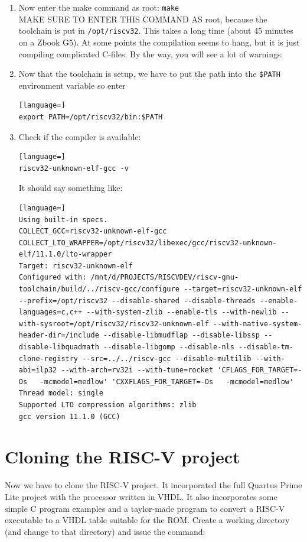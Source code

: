 \documentclass[12pt]{article}
\begin{document}
\begin{enumerate}
\item Now enter the make command as root: \lstinline|make|\\
MAKE SURE TO ENTER THIS COMMAND AS root, because the toolchain is put in \lstinline|/opt/riscv32|. This takes a long time (about 45 minutes on a Zbook G5). At some points the compilation seems to hang, but it is just compiling complicated C-files. By the way, you will see a lot of warnings.
\item Now that the toolchain is setup, we have to put the path into the \lstinline|$PATH| environment variable so enter
\begin{lstlisting}[language=]
export PATH=/opt/riscv32/bin:$PATH
\end{lstlisting}
\item Check if the compiler is available:
\begin{lstlisting}[language=]
riscv32-unknown-elf-gcc -v
\end{lstlisting}
It should say something like:
\begin{lstlisting}[language=]
Using built-in specs.
COLLECT_GCC=riscv32-unknown-elf-gcc
COLLECT_LTO_WRAPPER=/opt/riscv32/libexec/gcc/riscv32-unknown-elf/11.1.0/lto-wrapper
Target: riscv32-unknown-elf
Configured with: /mnt/d/PROJECTS/RISCVDEV/riscv-gnu-toolchain/build/../riscv-gcc/configure --target=riscv32-unknown-elf --prefix=/opt/riscv32 --disable-shared --disable-threads --enable-languages=c,c++ --with-system-zlib --enable-tls --with-newlib --with-sysroot=/opt/riscv32/riscv32-unknown-elf --with-native-system-header-dir=/include --disable-libmudflap --disable-libssp --disable-libquadmath --disable-libgomp --disable-nls --disable-tm-clone-registry --src=../../riscv-gcc --disable-multilib --with-abi=ilp32 --with-arch=rv32i --with-tune=rocket 'CFLAGS_FOR_TARGET=-Os   -mcmodel=medlow' 'CXXFLAGS_FOR_TARGET=-Os   -mcmodel=medlow'
Thread model: single
Supported LTO compression algorithms: zlib
gcc version 11.1.0 (GCC) 
\end{lstlisting}
\end{enumerate}

\section{Cloning the RISC-V project}
\label{sec:cloning}
Now we have to clone the RISC-V project. It incorporated the full Quartus Prime Lite project with the processor written in VHDL. It also incorporates some simple C program examples and a taylor-made program to convert a RISC-V executable to a VHDL table suitable for the ROM. Create a working directory (and change to that directory) and issue the command:
\end{document}
